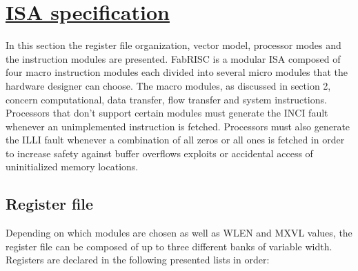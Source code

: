 \section[ISA specification]{\LARGE\underline{ISA specification}}

    \vspace{10pt}

    In this section the register file organization, vector model, processor modes and the instruction modules are presented. FabRISC is a modular ISA composed of four macro instruction modules each divided into several micro modules that the hardware designer can choose. The macro modules, as discussed in section 2, concern computational, data transfer, flow transfer and system instructions. Processors that don't support certain modules must generate the INCI fault whenever an unimplemented instruction is fetched. Processors must also generate the ILLI fault whenever a combination of all zeros or all ones is fetched in order to increase safety against buffer overflows exploits or accidental access of uninitialized memory locations.

    \subsection{Register file}

        \vspace{10pt}

        Depending on which modules are chosen as well as WLEN and MXVL values, the register file can be composed of up to three different banks of variable width. Registers are declared in the following presented lists in order:

